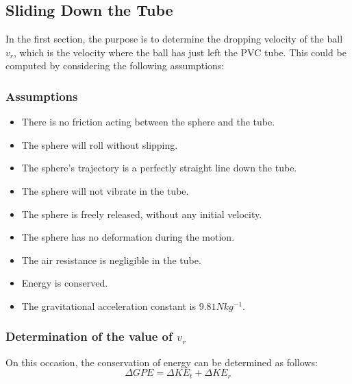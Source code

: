 \documentclass{article}
\begin{document}
    \subsection{Sliding Down the Tube}
        In the first section, the purpose is to determine the dropping velocity of the ball $v_r$, which is the velocity where the ball has just left the PVC tube. This could be computed by considering the following assumptions:
        \subsubsection{Assumptions}
            \begin{itemize}
                \item There is no friction acting between the sphere and the tube.
                \item The sphere will roll without slipping.
                \item The sphere's trajectory is a perfectly straight line down the tube.
                \item The sphere will not vibrate in the tube.
                \item The sphere is freely released, without any initial velocity.
                \item The sphere has no deformation during the motion.
                \item The air resistance is negligible in the tube.
                \item Energy is conserved.
                \item The gravitational acceleration constant is $9.81Nkg^{-1}$.
            \end{itemize}

    
        \subsubsection{Determination of the value of $v_r$}
            On this occasion, the conservation of energy can be determined as follows:
            \begin{equation}
                \Delta GPE = \Delta KE_t + \Delta KE_r \nonumber
            \end{equation}
\end{document}

